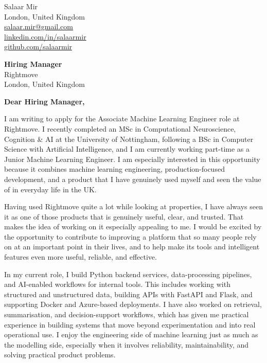 \documentclass[a4paper,10pt]{article}
\begin{document}
\begin{flushright}
{\small
Salaar Mir \\
London, United Kingdom \\
\href{mailto:salaar.mir@gmail.com}{salaar.mir@gmail.com} \\
\href{https://www.linkedin.com/in/salaarmir}{linkedin.com/in/salaarmir} \\
\href{https://github.com/salaarmir}{github.com/salaarmir}
}
\end{flushright}

\vspace{8mm}

\begin{flushleft}
{\small
\textbf{Hiring Manager} \\
Rightmove \\
London, United Kingdom
}
\end{flushleft}

\vspace{4mm}

\textbf{Dear Hiring Manager,}

I am writing to apply for the Associate Machine Learning Engineer role at Rightmove. I recently completed an MSc in Computational Neuroscience, Cognition \& AI at the University of Nottingham, following a BSc in Computer Science with Artificial Intelligence, and I am currently working part-time as a Junior Machine Learning Engineer. I am especially interested in this opportunity because it combines machine learning engineering, production-focused development, and a product that I have genuinely used myself and seen the value of in everyday life in the UK.

Having used Rightmove quite a lot while looking at properties, I have always seen it as one of those products that is genuinely useful, clear, and trusted. That makes the idea of working on it especially appealing to me. I would be excited by the opportunity to contribute to improving a platform that so many people rely on at an important point in their lives, and to help make its tools and intelligent features even more useful, reliable, and effective.

In my current role, I build Python backend services, data-processing pipelines, and AI-enabled workflows for internal tools. This includes working with structured and unstructured data, building APIs with FastAPI and Flask, and supporting Docker and Azure-based deployments. I have also worked on retrieval, summarisation, and decision-support workflows, which has given me practical experience in building systems that move beyond experimentation and into real operational use. I enjoy the engineering side of machine learning just as much as the modelling side, especially when it involves reliability, maintainability, and solving practical product problems.
\end{document}
